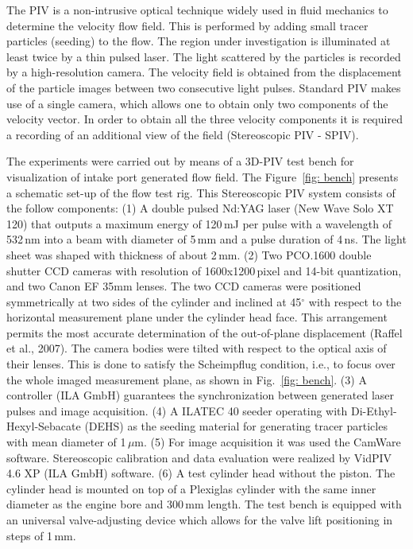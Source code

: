 \documentclass[12pt,a4paper]{article}
\begin{document}
The PIV is a non-intrusive optical technique widely used in fluid mechanics to determine the velocity flow field. This is performed by adding small tracer particles (seeding) to the flow. The region under investigation is illuminated at least twice by a thin pulsed laser. The light scattered by the particles is recorded by a high-resolution camera. The velocity field is obtained from the displacement of the particle images between two consecutive light pulses. Standard PIV makes use of a single camera, which allows one to obtain only two components of the velocity vector. In order to obtain all the three velocity components it is required a recording of an additional view of the field (Stereoscopic PIV - SPIV).

The experiments were carried out by means of a 3D-PIV test bench for visualization of intake port generated flow field. The Figure~\ref{fig: bench} presents a schematic set-up of the flow test rig. This Stereoscopic PIV system consists of the follow components: (1) A double pulsed Nd:YAG laser (New Wave Solo XT 120) that outputs a maximum energy of 120\,mJ per pulse with a wavelength of 532\,nm into a beam with diameter of 5\,mm and a pulse duration of 4\,ns. The light sheet was shaped with thickness of about 2\,mm. (2) Two PCO.1600 double shutter CCD cameras with resolution of 1600x1200\,pixel and 14-bit quantization, and two Canon EF 35mm lenses. The two CCD cameras were positioned symmetrically at two sides of the cylinder and inclined at 45$^{\circ}$ with respect to the horizontal measurement plane under the cylinder head face. This arrangement permits the most accurate determination of the out-of-plane displacement (Raffel et al., 2007). The camera bodies were tilted with respect to the optical axis of 
their lenses. This is done to satisfy the Scheimpflug condition, i.e., to focus over the whole imaged measurement plane, as shown in Fig.~\ref{fig: bench}. (3) A controller (ILA GmbH) guarantees the synchronization between generated laser pulses and image acquisition. (4) A ILATEC 40 seeder operating with Di-Ethyl-Hexyl-Sebacate (DEHS) as the seeding material for generating tracer particles with mean diameter of 1\,$\mu$m. (5) For image acquisition it was used the CamWare software. Stereoscopic calibration and data evaluation were realized by VidPIV 4.6 XP (ILA GmbH) software. (6) A test cylinder head without the piston. The cylinder head is mounted on top of a Plexiglas cylinder with the same inner diameter as the engine bore and 300\,mm length. The test bench is equipped with an universal valve-adjusting device which allows for the valve lift positioning in steps of 1\,mm. %
\end{document}
